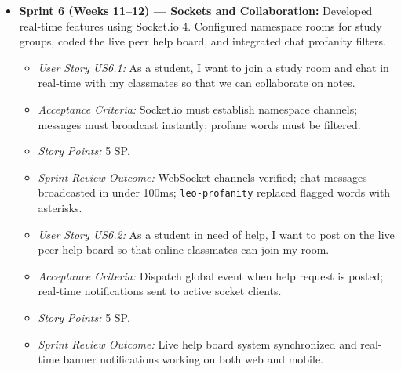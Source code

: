 \documentclass[12,Times new Roman,a4paper]{report}
\begin{document}
\begin{itemize}
    \item \textbf{Sprint 6 (Weeks 11--12) --- Sockets and Collaboration:} Developed real-time features using Socket.io 4. Configured namespace rooms for study groups, coded the live peer help board, and integrated chat profanity filters.
    \begin{itemize}
        \item \textit{User Story US6.1:} As a student, I want to join a study room and chat in real-time with my classmates so that we can collaborate on notes.
        \item \textit{Acceptance Criteria:} Socket.io must establish namespace channels; messages must broadcast instantly; profane words must be filtered.
        \item \textit{Story Points:} 5 SP.
        \item \textit{Sprint Review Outcome:} WebSocket channels verified; chat messages broadcasted in under 100ms; \texttt{leo-profanity} replaced flagged words with asterisks.
    \end{itemize}
    \begin{itemize}
        \item \textit{User Story US6.2:} As a student in need of help, I want to post on the live peer help board so that online classmates can join my room.
        \item \textit{Acceptance Criteria:} Dispatch global event when help request is posted; real-time notifications sent to active socket clients.
        \item \textit{Story Points:} 5 SP.
        \item \textit{Sprint Review Outcome:} Live help board system synchronized and real-time banner notifications working on both web and mobile.
    \end{itemize}
    

\end{itemize}
\end{document}
